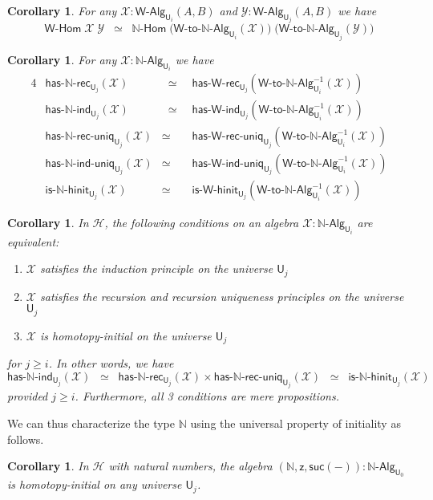 \documentclass[reqno,10pt,a4paper,oneside]{amsart}
\newcommand{\X}{\mathcal{X}}
\newcommand{\Y}{\mathcal{Y}}
\newcommand{\z}{\mathsf{z}}
\newcommand{\suc}{\mathsf{suc}}
\newcommand{\nat}{\ensuremath{\mathbb{N}}}
\newcommand{\W}{\mathsf{W}}
\newcommand{\UU}{\mathsf{U}}
\newcommand{\NatAlg}{\nat\text{-}\mathsf{Alg}}
\newcommand{\NatHom}{\nat\text{-}\mathsf{Hom}}
\newcommand{\HasNatRec}{\mathsf{has}\text{-}\nat\text{-}\mathsf{rec}}
\newcommand{\HasNatInd}{\mathsf{has}\text{-}\nat\text{-}\mathsf{ind}}
\newcommand{\HasNatRecUniq}{\mathsf{has}\text{-}\nat\text{-}\mathsf{rec}\text{-}\mathsf{uniq}}
\newcommand{\HasNatIndUniq}{\mathsf{has}\text{-}\nat\text{-}\mathsf{ind}\text{-}\mathsf{uniq}}
\newcommand{\IsNatHInit}{\mathsf{is}\text{-}\nat\text{-}\mathsf{hinit}}
\newcommand{\WAlgToNatAlg}{\W\text{-}\mathsf{to}\text{-}\nat\text{-}\mathsf{Alg}}
\newcommand{\WAlg}{\mathsf{W}\text{-}\mathsf{Alg}}
\newcommand{\WHom}{\mathsf{W}\text{-}\mathsf{Hom}}
\newcommand{\HasWRec}{\mathsf{has}\text{-}\mathsf{W}\text{-}\mathsf{rec}}
\newcommand{\HasWInd}{\mathsf{has}\text{-}\mathsf{W}\text{-}\mathsf{ind}}
\newcommand{\HasWRecUniq}{\mathsf{has}\text{-}\mathsf{W}\text{-}\mathsf{rec}\text{-}\mathsf{uniq}}
\newcommand{\HasWIndUniq}{\mathsf{has}\text{-}\mathsf{W}\text{-}\mathsf{ind}\text{-}\mathsf{uniq}}
\newcommand{\IsWHInit}{\mathsf{is}\text{-}\mathsf{\W}\text{-}\mathsf{hinit}}
\newcommand{\Hint}{\mathcal{H}}
\numberwithin{equation}{section}
\theoremstyle{mythm}
\newtheorem{corollary}[theorem]{Corollary}
\theoremstyle{mydef}
\theoremstyle{myrmk}
\begin{document}
\begin{corollary}
For any $\X : \WAlg_{\UU_i}(A,B)$ and $\Y : \WAlg_{\UU_j}(A,B)$ we have
\[ \WHom \; \X \; \Y \;\; \simeq \;\; \NatHom \; \big(\WAlgToNatAlg_{\UU_i}(\X)\big) \; \big(\WAlgToNatAlg_{\UU_j}(\Y)\big) \]
\end{corollary}

\begin{corollary}
For any $\X : \NatAlg_{\UU_i}$ we have
\begin{alignat*}{4}
& \HasNatRec_{\UU_j}(\X) & \;\; \simeq \;\; & \HasWRec_{\UU_j}(\WAlgToNatAlg_{\UU_i}^{-1}(\X)) \\
& \HasNatInd_{\UU_j}(\X) & \;\; \simeq \;\; & \HasWInd_{\UU_j}(\WAlgToNatAlg_{\UU_i}^{-1}(\X)) \\
& \HasNatRecUniq_{\UU_j}(\X) &  \simeq \;\; & \HasWRecUniq_{\UU_j}(\WAlgToNatAlg_{\UU_i}^{-1}(\X)) \\
& \HasNatIndUniq_{\UU_j}(\X) & \simeq \;\; &  \HasWIndUniq_{\UU_j}(\WAlgToNatAlg_{\UU_i}^{-1}(\X)) \\
& \IsNatHInit_{\UU_j}(\X) & \simeq \;\; & \IsWHInit_{\UU_j}(\WAlgToNatAlg_{\UU_i}^{-1}(\X))
\end{alignat*}
\end{corollary}

\begin{corollary}\label{lem:NatMainInt}
In $\Hint$, the following conditions on an algebra $\X : \NatAlg_{\UU_i}$ are equivalent:
\begin{enumerate}
\item $\X$ satisfies the induction principle on the universe $\UU_j$
\item $\X$ satisfies the recursion and recursion uniqueness principles on the universe $\UU_j$
\item $\X$ is homotopy-initial on the universe $\UU_j$  
\end{enumerate}
for $j \geq i$. In other words, we have \[ \HasNatInd_{\UU_j}(\X)  \;\; \simeq \;\; \HasNatRec_{\UU_j}(\X) \times \HasNatRecUniq_{\UU_j}(\X) \;\; \simeq \;\; \IsNatHInit_{\UU_j}(\X) \]
provided $j \geq i$. Furthermore, all 3 conditions are mere propositions.
\end{corollary}

We can thus characterize the type $\nat$ using the universal property of initiality as follows.
\begin{corollary}\label{lem:NatInitInt}
In $\Hint$ with natural numbers, the algebra $(\nat,\z,\suc(-)) : \NatAlg_{\UU_0}$ is homotopy-initial on any universe $\UU_j$.
\end{corollary}
\end{document}
